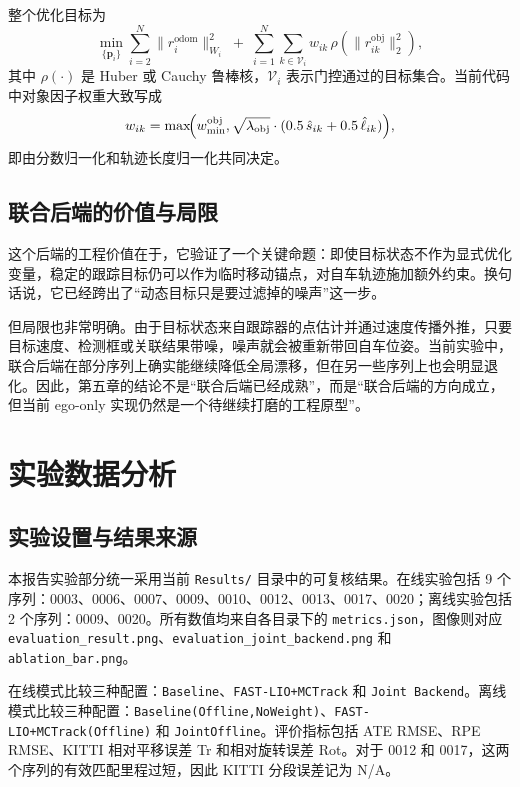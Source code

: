 \documentclass[UTF8,a4paper,12pt]{ctexart}
\begin{document}
整个优化目标为
\begin{equation}
\min_{\{\mathbf{p}_i\}}
\sum_{i=2}^{N}\|r^{\mathrm{odom}}_i\|_{W_i}^2
\;+\;
\sum_{i=1}^{N}\sum_{k\in\mathcal{V}_i}
w_{ik}\,\rho\!\left(\|r^{\mathrm{obj}}_{ik}\|_2^2\right),
\end{equation}
其中 \(\rho(\cdot)\) 是 Huber 或 Cauchy 鲁棒核，\(\mathcal{V}_i\) 表示门控通过的目标集合。当前代码中对象因子权重大致写成
\begin{equation}
w_{ik}=
\max\!\Bigl(
w_{\min}^{\mathrm{obj}},
\sqrt{\lambda_{\mathrm{obj}}}\cdot
(0.5\,\hat{s}_{ik}+0.5\,\hat{\ell}_{ik})
\Bigr),
\end{equation}
即由分数归一化和轨迹长度归一化共同决定。

\subsection{联合后端的价值与局限}
这个后端的工程价值在于，它验证了一个关键命题：即使目标状态不作为显式优化变量，稳定的跟踪目标仍可以作为临时移动锚点，对自车轨迹施加额外约束。换句话说，它已经跨出了“动态目标只是要过滤掉的噪声”这一步。

但局限也非常明确。由于目标状态来自跟踪器的点估计并通过速度传播外推，只要目标速度、检测框或关联结果带噪，噪声就会被重新带回自车位姿。当前实验中，联合后端在部分序列上确实能继续降低全局漂移，但在另一些序列上也会明显退化。因此，第五章的结论不是“联合后端已经成熟”，而是“联合后端的方向成立，但当前 ego-only 实现仍然是一个待继续打磨的工程原型”。

\section{实验数据分析}
\subsection{实验设置与结果来源}
本报告实验部分统一采用当前 \texttt{Results/} 目录中的可复核结果。在线实验包括 9 个序列：0003、0006、0007、0009、0010、0012、0013、0017、0020；离线实验包括 2 个序列：0009、0020。所有数值均来自各目录下的 \texttt{metrics.json}，图像则对应 \texttt{evaluation\_result.png}、\texttt{evaluation\_joint\_backend.png} 和 \texttt{ablation\_bar.png}。

在线模式比较三种配置：\texttt{Baseline}、\texttt{FAST-LIO+MCTrack} 和 \texttt{Joint Backend}。离线模式比较三种配置：\texttt{Baseline(Offline,NoWeight)}、\texttt{FAST-LIO+MCTrack(Offline)} 和 \texttt{JointOffline}。评价指标包括 ATE RMSE、RPE RMSE、KITTI 相对平移误差 Tr 和相对旋转误差 Rot。对于 0012 和 0017，这两个序列的有效匹配里程过短，因此 KITTI 分段误差记为 N/A。
\end{document}
